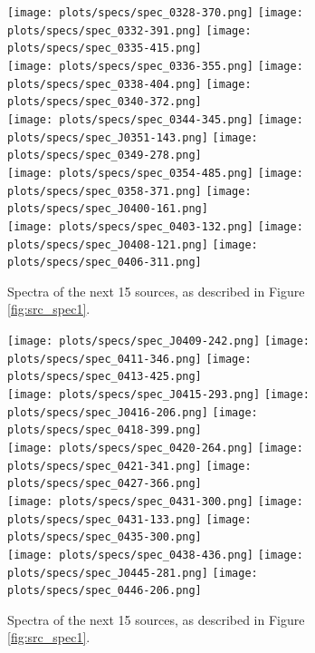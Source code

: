\documentclass[preprint]{aastex}
\begin{document}
\begin{figure}\centering
\texttt{[image: plots/specs/spec\_0328-370.png]}
\texttt{[image: plots/specs/spec\_0332-391.png]}
\texttt{[image: plots/specs/spec\_0335-415.png]}\\
\texttt{[image: plots/specs/spec\_0336-355.png]}
\texttt{[image: plots/specs/spec\_0338-404.png]}
\texttt{[image: plots/specs/spec\_0340-372.png]}\\
\texttt{[image: plots/specs/spec\_0344-345.png]}
\texttt{[image: plots/specs/spec\_J0351-143.png]}
\texttt{[image: plots/specs/spec\_0349-278.png]}\\
\texttt{[image: plots/specs/spec\_0354-485.png]}
\texttt{[image: plots/specs/spec\_0358-371.png]}
\texttt{[image: plots/specs/spec\_J0400-161.png]}\\
\texttt{[image: plots/specs/spec\_0403-132.png]}
\texttt{[image: plots/specs/spec\_J0408-121.png]}
\texttt{[image: plots/specs/spec\_0406-311.png]}\\
\caption{Spectra of the next 15 sources, as described in Figure \ref{fig:src_spec1}.
}\label{fig:src_spec8}
\end{figure}\clearpage

\begin{figure}\centering
\texttt{[image: plots/specs/spec\_J0409-242.png]}
\texttt{[image: plots/specs/spec\_0411-346.png]}
\texttt{[image: plots/specs/spec\_0413-425.png]}\\
\texttt{[image: plots/specs/spec\_J0415-293.png]}
\texttt{[image: plots/specs/spec\_J0416-206.png]}
\texttt{[image: plots/specs/spec\_0418-399.png]}\\
\texttt{[image: plots/specs/spec\_0420-264.png]}
\texttt{[image: plots/specs/spec\_0421-341.png]}
\texttt{[image: plots/specs/spec\_0427-366.png]}\\
\texttt{[image: plots/specs/spec\_0431-300.png]}
\texttt{[image: plots/specs/spec\_0431-133.png]}
\texttt{[image: plots/specs/spec\_0435-300.png]}\\
\texttt{[image: plots/specs/spec\_0438-436.png]}
\texttt{[image: plots/specs/spec\_J0445-281.png]}
\texttt{[image: plots/specs/spec\_0446-206.png]}\\
\caption{Spectra of the next 15 sources, as described in Figure \ref{fig:src_spec1}.
}\label{fig:src_spec9}
\end{figure}\clearpage
\end{document}
